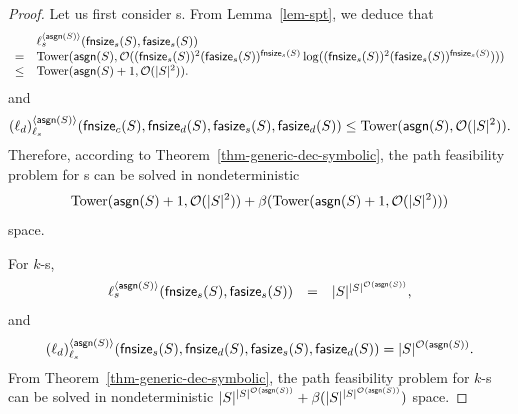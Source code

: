 \begin{proof}
Let us first consider \SSPT{}s. From Lemma~\ref{lem-spt}, we deduce that 
{\small
$$
\begin{array}{l l}
& \ell_s^{\langle \mathsf{asgn}(S) \rangle}(\mathsf{fnsize}_s(S), \mathsf{fasize}_s(S)) \\
=& \mathrm{Tower}(\mathsf{asgn}(S), \mathcal{O}((\mathsf{fnsize}_s(S))^2 (\mathsf{fasize}_s(S))^{\mathsf{fnsize}_s(S)} \log ((\mathsf{fnsize}_s(S))^2 (\mathsf{fasize}_s(S))^{\mathsf{fnsize}_s(S)}) )) \\ 
\le &  \mathrm{Tower}(\mathsf{asgn}(S)+1, \mathcal{O}(|S|^2)).
\end{array}
$$
}
and
$$
(\ell_d)^{\langle \mathsf{asgn}(S) \rangle}_{\ell_s}(\mathsf{fnsize}_c(S), \mathsf{fnsize}_d(S), \mathsf{fasize}_s(S), \mathsf{fasize}_d(S)) \\
\le  \mathrm{Tower}(\mathsf{asgn}(S), \mathcal{O}(|S|^2)).
$$
Therefore, according to Theorem~\ref{thm-generic-dec-symbolic},  the path feasibility problem for \SSPT{}s can be solved in nondeterministic 
$$\mathrm{Tower}(\mathsf{asgn}(S)+1, \mathcal{O}(|S|^2)) + \beta(\mathrm{Tower}(\mathsf{asgn}(S)+1, \mathcal{O}(|S|^2)))$$
 space.
 
 For $k$-\RBSSPT{}s, 
 $$
\begin{array}{l c l}
\ell_s^{\langle \mathsf{asgn}(S) \rangle}(\mathsf{fnsize}_s(S), \mathsf{fasize}_s(S)) &=& |S|^{|S|^{\mathcal{O}(\mathsf{asgn}(S))}},
\end{array}
$$
and
$$
(\ell_d)^{\langle \mathsf{asgn}(S) \rangle}_{\ell_s}(\mathsf{fnsize}_s(S), \mathsf{fnsize}_d(S), \mathsf{fasize}_s(S), \mathsf{fasize}_d(S)) = |S|^{\mathcal{O}(\mathsf{asgn}(S))}.
$$
From Theorem~\ref{thm-generic-dec-symbolic}, the path feasibility problem for $k$-\RBSSPT{}s can be solved in nondeterministic 
$|S|^{|S|^{\mathcal{O}(\mathsf{asgn}(S))}} + \beta(|S|^{|S|^{\mathcal{O}(\mathsf{asgn}(S))}})$
space.
%
\end{proof}
